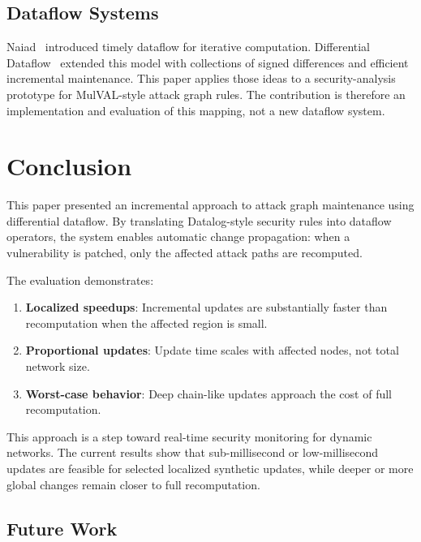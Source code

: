 \documentclass[conference]{IEEEtran}
\begin{document}
\subsection{Dataflow Systems}

Naiad~\cite{murray2013naiad} introduced timely dataflow for iterative computation. Differential Dataflow~\cite{mcsherry2013differential} extended this model with collections of signed differences and efficient incremental maintenance. This paper applies those ideas to a security-analysis prototype for MulVAL-style attack graph rules. The contribution is therefore an implementation and evaluation of this mapping, not a new dataflow system.

\section{Conclusion}

This paper presented an incremental approach to attack graph maintenance using differential dataflow. By translating Datalog-style security rules into dataflow operators, the system enables automatic change propagation: when a vulnerability is patched, only the affected attack paths are recomputed.

The evaluation demonstrates:

\begin{enumerate}
    \item \textbf{Localized speedups}: Incremental updates are substantially
    faster than recomputation when the affected region is small.
    \item \textbf{Proportional updates}: Update time scales with affected nodes, not total network size.
    \item \textbf{Worst-case behavior}: Deep chain-like updates approach the cost of full recomputation.
\end{enumerate}

This approach is a step toward real-time security monitoring for dynamic
networks. The current results show that sub-millisecond or low-millisecond
updates are feasible for selected localized synthetic updates, while deeper or
more global changes remain closer to full recomputation.

\subsection{Future Work}
\end{document}
